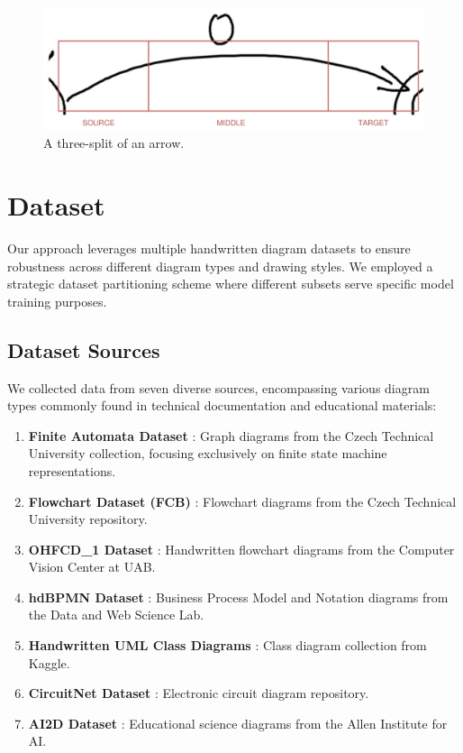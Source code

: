 \documentclass[conference]{IEEEtran}
\begin{document}
\begin{figure}
	\centering
	\includegraphics[width=\linewidth]{arrowsplit.jpg}
	\caption{A three-split of an arrow.}
	\label{fig:arrowsplit}
\end{figure}

\section{Dataset}
Our approach leverages multiple handwritten diagram datasets to ensure robustness across different diagram types and drawing styles. We employed a strategic dataset partitioning scheme where different subsets serve specific model training purposes.

\subsection{Dataset Sources}

We collected data from seven diverse sources, encompassing various diagram types commonly found in technical documentation and educational materials:

\begin{enumerate}
	\item \textbf{Finite Automata Dataset} \cite{online1}: Graph diagrams from the Czech Technical University collection, focusing exclusively on finite state machine representations.
	\item \textbf{Flowchart Dataset (FCB)} \cite{online3}: Flowchart diagrams from the Czech Technical University repository.
	\item \textbf{OHFCD\_1 Dataset} \cite{ohfcd}: Handwritten flowchart diagrams from the Computer Vision Center at UAB.
	\item \textbf{hdBPMN Dataset} \cite{BPMN}: Business Process Model and Notation diagrams from the Data and Web Science Lab.
	\item \textbf{Handwritten UML Class Diagrams} \cite{modelsketch}: Class diagram collection from Kaggle.
	\item \textbf{CircuitNet Dataset} \cite{circuitnet}: Electronic circuit diagram repository.
	\item \textbf{AI2D Dataset} \cite{ai2d}: Educational science diagrams from the Allen Institute for AI.
\end{enumerate}
\end{document}
